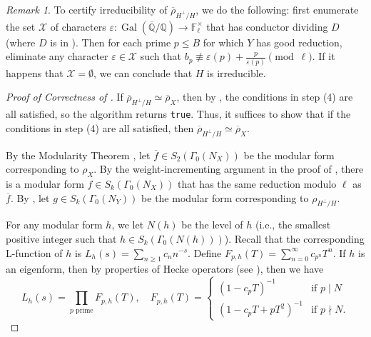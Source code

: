 \documentclass{amsproc}
\numberwithin{equation}{section}
\theoremstyle{definition}
\theoremstyle{remark}
\newtheorem{remark}[equation]{Remark}
\DeclareMathOperator{\Gal}{Gal}
\newcommand{\eps}{\varepsilon}
\newcommand{\QQ}{\mathbb Q}
\newcommand{\FF}{\mathbb F}
\newcommand{\Qbar}{\overline{\QQ}}
\newcommand{\GalQ}{\Gal(\Qbar/\QQ)}
\newcommand{\rhoHperpH}{\overline\rho_{H^\perp\!/H}}
\begin{document}
\begin{remark}
    To certify irreducibility of $\rhoHperpH$, we do the following: first enumerate the set $\mathcal X$ of characters $\eps : \GalQ \to \FF_\ell^\times$ that has conductor dividing $D$ (where $D$ is in ).
    Then for each prime $p\leq B$ for which $Y$ has good reduction, eliminate any character $\eps\in \mathcal X$ such that $b_p\not\equiv \eps(p) + \frac{p}{\eps(p)}\pmod{\ell}.$
    If it happens that $\mathcal X=\emptyset$, we can conclude that $H$ is irreducible.
\end{remark}
\begin{proof}[Proof of Correctness of ]
    If $\rhoHperpH\simeq\overline\rho_X$, then by , the conditions in step (4) are all satisfied, so the algorithm returns \texttt{true}.
    Thus, it suffices to show that if the conditions in step (4) are all satisfied, then $\rhoHperpH\simeq\overline\rho_X$.

    By the Modularity Theorem \cite[Thm.~A]{ec_modularity}, let $\overline f\in S_2(\Gamma_0(N_X))$ be the modular form corresponding to $\rho_X$.
    By the weight-incrementing argument in the proof of , there is a modular form $f\in S_k(\Gamma_0(N_X))$ that has the same reduction modulo $\ell$ as $\overline f$.
    By , let
    $g\in S_k(\Gamma_0(N_Y))$ be the modular form corresponding to $\rho_{H^\perp/H}$.
    
    For any modular form $h$, we let $N(h)$ be the level of 
    $h$ (i.e., the smallest positive  integer such that 
    $h\in S_k(\Gamma_0(N(h)))$).
    Recall that the corresponding L-function of $h$ is 
    $L_h(s) = \sum_{n\geq 1} c_n n^{-s}.$
    Define
    $F_{p,h}(T) = \sum_{n=0}^\infty c_{p^n} T^n.$
    If $h$ is an eigenform, then by properties of
    Hecke operators (see \cite[Thm.~5.9.2]{diamond_shurman}),
    then we have
    \begin{equation}
        L_h(s) = \prod_{p\text{ prime}} 
        F_{p,h}(T),\quad F_{p,h}(T) 
        = \begin{cases}
            (1 - c_pT)^{-1} & \text{if }p\mid N \\
            (1 - c_pT + pT^2)^{-1} & \text{if }p\nmid N.
        \end{cases}
    \end{equation}
    

\end{proof}
\end{document}
